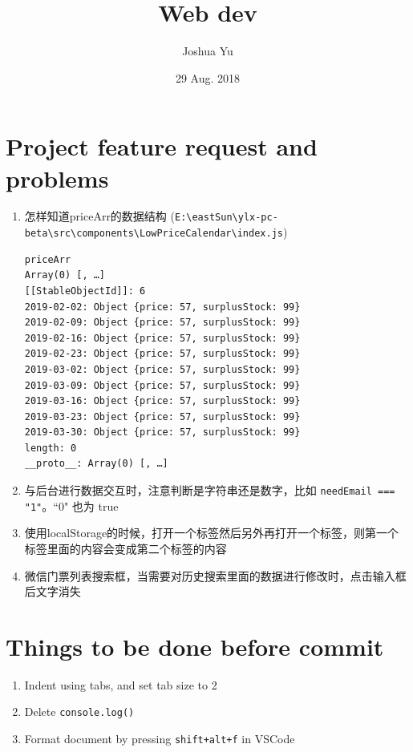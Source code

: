 \documentclass[a4paper, 12pt]{article}
\begin{document}

\large
\title{Web dev}
\author{Joshua Yu}
\date{29 Aug. 2018}
\maketitle
\tableofcontents


\section{Project feature request and problems}
\begin{enumerate}

\item 怎样知道priceArr的数据结构 (\verb|E:\eastSun\ylx-pc-beta\src\components|\linebreak \verb|\LowPriceCalendar\index.js|)
\begin{verbatim}
priceArr
Array(0) [, …]
[[StableObjectId]]: 6
2019-02-02: Object {price: 57, surplusStock: 99}
2019-02-09: Object {price: 57, surplusStock: 99}
2019-02-16: Object {price: 57, surplusStock: 99}
2019-02-23: Object {price: 57, surplusStock: 99}
2019-03-02: Object {price: 57, surplusStock: 99}
2019-03-09: Object {price: 57, surplusStock: 99}
2019-03-16: Object {price: 57, surplusStock: 99}
2019-03-23: Object {price: 57, surplusStock: 99}
2019-03-30: Object {price: 57, surplusStock: 99}
length: 0
__proto__: Array(0) [, …]
\end{verbatim}

\item 与后台进行数据交互时，注意判断是字符串还是数字，比如 \verb|needEmail === "1"|。``0" 也为 true

\item 使用localStorage的时候，打开一个标签然后另外再打开一个标签，则第一个标签里面的内容会变成第二个标签的内容

\item 微信门票列表搜索框，当需要对历史搜索里面的数据进行修改时，点击输入框后文字消失
\end{enumerate}

\section{Things to be done before commit}
\begin{enumerate}

\item Indent using tabs, and set tab size to 2

\item Delete \verb|console.log()|

\item Format document by pressing \verb|shift+alt+f| in VSCode

\end{enumerate}
\end{document}

